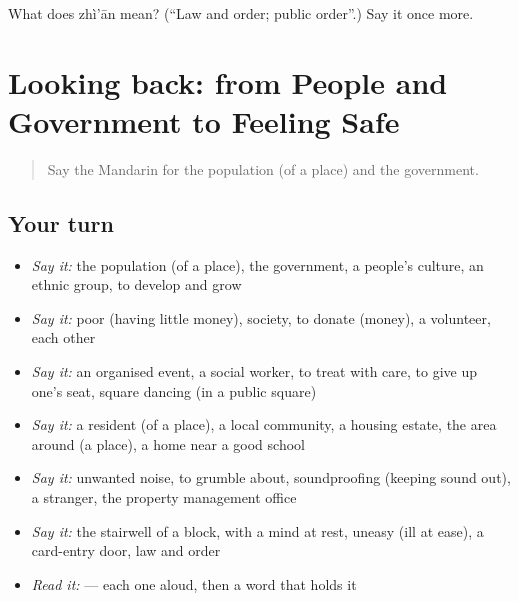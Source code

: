 \begin{tcolorbox}[breakable,colback=teal!4,colframe=teal!35!black,title={Before you move on}]
What does zhì'ān mean? (\textquotedblleft{}Law and order; public order\textquotedblright{}.) Say it once more.
\end{tcolorbox}
\section[(dialogue)]{Looking back: from People and Government to Feeling Safe}

\label{lesson:ZH-R379-review-374-379}



\begin{quote}
Say the Mandarin for the population (of a place) and the government.
\end{quote}

\subsection*{Your turn}
\begin{itemize}
\raggedright
  \item \emph{Say it:} the population (of a place), the government, a people's culture, an ethnic group, to develop and grow
  \item \emph{Say it:} poor (having little money), society, to donate (money), a volunteer, each other
  \item \emph{Say it:} an organised event, a social worker, to treat with care, to give up one's seat, square dancing (in a public square)
  \item \emph{Say it:} a resident (of a place), a local community, a housing estate, the area around (a place), a home near a good school
  \item \emph{Say it:} unwanted noise, to grumble about, soundproofing (keeping sound out), a stranger, the property management office
  \item \emph{Say it:} the stairwell of a block, with a mind at rest, uneasy (ill at ease), a card-entry door, law and order
  \item \emph{Read it:}    — each one aloud, then a word that holds it
\end{itemize}

